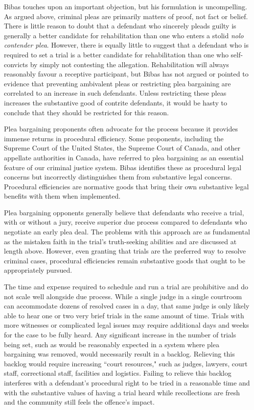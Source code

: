 Bibas touches upon an important objection, but his formulation is uncompelling. As argued above, criminal pleas are primarily matters of proof, not fact or belief. There is little reason to doubt that a defendant who sincerely pleads guilty is generally a better candidate for rehabilitation than one who enters a stolid \textit{nolo contender plea}. However, there is equally little to suggest that a defendant who is required to set a trial is a better candidate for rehabilitation than one who self-convicts by simply not contesting the allegation. Rehabilitation will always reasonably favour a receptive participant, but Bibas has not argued or pointed to evidence that preventing ambivalent pleas or restricting plea bargaining are correlated to an increase in such defendants. Unless restricting these pleas increases the substantive good of contrite defendants, it would be hasty to conclude that they should be restricted for this reason.

Plea bargaining proponents often advocate for the process because it provides immense returns in procedural efficiency. Some proponents, including the Supreme Court of the United States, the Supreme Court of Canada, and other appellate authorities in Canada, have referred to plea bargaining as an essential feature of our criminal justice system. Bibas identifies these as procedural legal concerns but incorrectly distinguishes them from substantive legal concerns. Procedural efficiencies are normative goods that bring their own substantive legal benefits with them when implemented. 

Plea bargaining opponents generally believe that defendants who receive a trial, with or without a jury, receive superior due process compared to defendants who negotiate an early plea deal. The problems with this approach are as fundamental as the mistaken faith in the trial's truth-seeking abilities and are discussed at length above. However, even granting that trials are the preferred way to resolve criminal cases, procedural efficiencies remain substantive goods that ought to be appropriately pursued. 

The time and expense required to schedule and run a trial are prohibitive and do not scale well alongside due process. While a single judge in a single courtroom can accommodate dozens of resolved cases in a day, that same judge is only likely able to hear one or two very brief trials in the same amount of time. Trials with more witnesses or complicated legal issues may require additional days and weeks for the case to be fully heard. Any significant increase in the number of trials being set, such as would be reasonably expected in a system where plea bargaining was removed, would necessarily result in a backlog. Relieving this backlog would require increasing ``court resources," such as judges, lawyers, court staff, correctional staff, facilities and logistics. Failing to relieve this backlog interferes with a defendant's procedural right to be tried in a reasonable time and with the substantive values of having a trial heard while recollections are fresh and the community still feels the offence's impact. 

